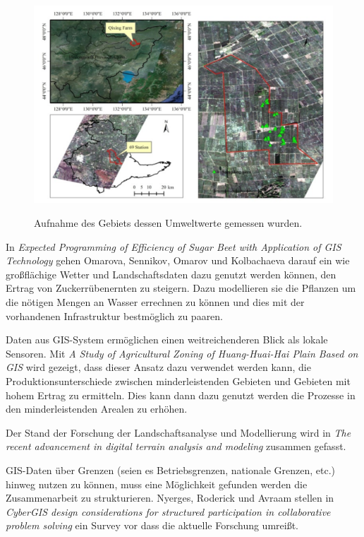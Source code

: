 \begin{figure}[h]
 \includegraphics[scale=0.4,natwidth=\textwidth]{figures/sensors/satellite_area.png}
 \centering
 \label{fig:fmishierarchy}
 \caption{Aufnahme des Gebiets dessen Umweltwerte gemessen wurden. \cite{jour:Huang2013}}
\end{figure}

In \textit{Expected Programming of Efficiency of Sugar
Beet with Application of GIS Technology} gehen Omarova, Sennikov, Omarov und Kolbachaeva darauf ein wie großflächige Wetter und Landschaftsdaten dazu genutzt werden können, den Ertrag von Zuckerrübenernten zu steigern. Dazu modellieren sie die Pflanzen um die nötigen Mengen an Wasser errechnen zu können und dies mit der vorhandenen Infrastruktur bestmöglich zu paaren.\cite{jour:Omarova2013}

Daten aus GIS-System ermöglichen einen weitreichenderen Blick als lokale Sensoren. Mit \textit{A Study of Agricultural Zoning of Huang-Huai-Hai Plain Based on GIS} wird gezeigt, dass dieser Ansatz dazu verwendet werden kann, die Produktionsunterschiede zwischen minderleistenden Gebieten und Gebieten mit hohem Ertrag zu ermitteln. Dies kann dann dazu genutzt werden die Prozesse in den minderleistenden Arealen zu erhöhen.\cite{book:Hou2013}

Der Stand der Forschung der Landschaftsanalyse und Modellierung wird in \textit{The recent advancement in digital
terrain analysis and modeling} zusammen gefasst.\cite{jour:Zhou2013}

GIS-Daten über Grenzen (seien es Betriebsgrenzen, nationale Grenzen, etc.) hinweg nutzen zu können, muss eine Möglichkeit gefunden werden die Zusammenarbeit zu strukturieren. Nyerges, Roderick und Avraam stellen in \textit{CyberGIS design considerations for structured participation in collaborative problem solving} ein Survey vor dass die aktuelle Forschung umreißt. \cite{jour:Nyerges2013}
